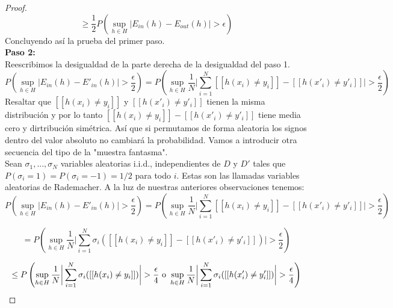 \begin{proof}
\[ \geq \frac{1}{2} P \left(\sup_{h \in H} \vert E_{in}(h)-E_{out}(h) \vert > \epsilon  \right) \]
Concluyendo así la prueba del primer paso.\\
\textbf{Paso 2:}\\
Reescribimos la desigualdad de la parte derecha de la desigualdad del paso 1.
\[ P \left( \sup_{h \in H} \vert E_{in}(h)-E'_{in}(h) \vert >\frac{\epsilon}{2} \right) = P \left( \sup_{h \in H} \frac{1}{N} \bigg\vert \sum_{i=1}^{N} [[ h(x_{i}) \neq y_{i} ]] - [[ h(x'_{i}) \neq y'_{i} ]] \bigg\vert > \frac{\epsilon}{2} \right) \]
Resaltar que $[[ h(x_{i}) \neq y_{i} ]]$ y $[[ h(x'_{i}) \neq y'_{i} ]]$ tienen la misma distribución y por lo tanto $[[ h(x_{i}) \neq y_{i} ]] - [[ h(x'_{i}) \neq y'_{i} ]]$ tiene media cero y dirtribución simétrica. Así que si permutamos de forma aleatoria los signos dentro del valor absoluto no cambiará la probabilidad. Vamos a introducir otra secuencia del tipo de la "muestra fantasma".\\
Sean $\sigma_{1},...,\sigma_{N}$ variables aleatorias i.i.d., independientes de $D$ y $D'$ tales que $P(\sigma_{i}=1)=P(\sigma_{i}=-1)=1/2$ para todo $i$. Estas son las llamadas variables aleatorias de Rademacher. A la luz de nuestras anteriores observaciones tenemos:
\[ P \left( \sup_{h \in H} \vert E_{in}(h)-E'_{in}(h) \vert >\frac{\epsilon}{2} \right) = P \left( \sup_{h \in H} \frac{1}{N} \bigg\vert \sum_{i=1}^{N} [[ h(x_{i}) \neq y_{i} ]] - [[ h(x'_{i}) \neq y'_{i} ]] \bigg\vert > \frac{\epsilon}{2} \right) \]

\[ = P \left( \sup_{h \in H} \frac{1}{N} \bigg\vert \sum_{i=1}^{N} \sigma_{i} ( [[ h(x_{i}) \neq y_{i} ]] - [[ h(x'_{i}) \neq y'_{i} ]]) \bigg\vert > \frac{\epsilon}{2} \right) \]

\[ \leq P \left( \sup_{h \in H} \frac{1}{N} \bigg\vert \sum_{i=1}^{N} \sigma_{i} ( [[ h(x_{i}) \neq y_{i} ]])\bigg\vert > \frac{\epsilon}{4} \textnormal{ o } \sup_{h \in H} \frac{1}{N} \bigg\vert \sum_{i=1}^{N} \sigma_{i} ( [[ h(x'_{i}) \neq y'_{i} ]]) \bigg\vert > \frac{\epsilon}{4} \right) \]


\end{proof}
